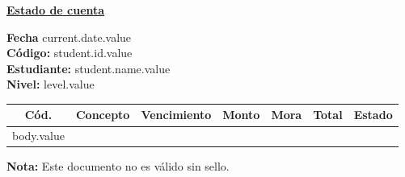 \documentclass[12pt]{article}
\newcommand{\aDupleLeft}[2]{\textbf{#1}\hspace{2mm} #2 \hfill}
\newcommand{\aDupleRight}[2]{\hfill\textbf{#1}\hspace{2mm} #2}
\newcommand{\levelName}{level.value}
\newcommand{\studentId}{student.id.value}
\newcommand{\studentName}{student.name.value}
\newcommand{\currentDate}{current.date.value}
\begin{document}
    \begin{center}
        \underline{\textbf{\Large Estado de cuenta}}
    \end{center}
    \aDupleRight{Fecha}{\currentDate}\\
    \aDupleLeft{Código:}{\studentId}\\
    \aDupleLeft{Estudiante:}{\studentName}\\
    \aDupleRight{Nivel:}{\levelName}

    \begin{table}[H]
        \centering
        \begin{tabular}{c | l | r | r | r | r | l}
            \hline
            Cód. & Concepto & Vencimiento & Monto &  Mora & Total & Estado\\\hline
            body.value
        \end{tabular}
    \end{table}
    
    \vfill
    \textbf{Nota:} Este documento no es válido sin sello.
    
\end{document}
